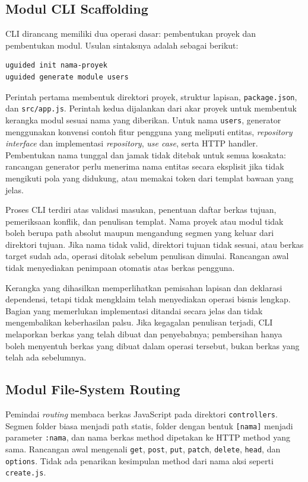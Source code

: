 \documentclass[12pt,a4paper,oneside]{report}
\begin{document}
\subsection{Modul CLI Scaffolding}
CLI dirancang memiliki dua operasi dasar: pembentukan proyek dan pembentukan modul. Usulan sintaksnya adalah sebagai berikut:
\begin{samepage}
\begin{singlespace}
\begin{verbatim}
uguided init nama-proyek
uguided generate module users
\end{verbatim}
\end{singlespace}
\end{samepage}
Perintah pertama membentuk direktori proyek, struktur lapisan, \texttt{package.json}, dan \texttt{src/\allowbreak app.js}. Perintah kedua dijalankan dari akar proyek untuk membentuk kerangka modul sesuai nama yang diberikan. Untuk nama \texttt{users}, generator menggunakan konvensi contoh fitur pengguna yang meliputi entitas, \textit{repository interface} dan implementasi \textit{repository}, \textit{use case}, serta HTTP handler. Pembentukan nama tunggal dan jamak tidak ditebak untuk semua kosakata: rancangan generator perlu menerima nama entitas secara eksplisit jika tidak mengikuti pola yang didukung, atau memakai token dari templat bawaan yang jelas.

Proses CLI terdiri atas validasi masukan, penentuan daftar berkas tujuan, pemeriksaan konflik, dan penulisan templat. Nama proyek atau modul tidak boleh berupa path absolut maupun mengandung segmen yang keluar dari direktori tujuan. Jika nama tidak valid, direktori tujuan tidak sesuai, atau berkas target sudah ada, operasi ditolak sebelum penulisan dimulai. Rancangan awal tidak menyediakan penimpaan otomatis atas berkas pengguna.

Kerangka yang dihasilkan memperlihatkan pemisahan lapisan dan deklarasi dependensi, tetapi tidak mengklaim telah menyediakan operasi bisnis lengkap. Bagian yang memerlukan implementasi ditandai secara jelas dan tidak mengembalikan keberhasilan palsu. Jika kegagalan penulisan terjadi, CLI melaporkan berkas yang telah dibuat dan penyebabnya; pembersihan hanya boleh menyentuh berkas yang dibuat dalam operasi tersebut, bukan berkas yang telah ada sebelumnya.

\subsection{Modul File-System Routing}
Pemindai \textit{routing} membaca berkas JavaScript pada direktori \texttt{controllers}. Segmen folder biasa menjadi path statis, folder dengan bentuk \texttt{[nama]} menjadi parameter \texttt{:nama}, dan nama berkas method dipetakan ke HTTP method yang sama. Rancangan awal mengenali \texttt{get}, \texttt{post}, \texttt{put}, \texttt{patch}, \texttt{delete}, \texttt{head}, dan \texttt{options}. Tidak ada penarikan kesimpulan method dari nama aksi seperti \texttt{create.js}.
\end{document}
